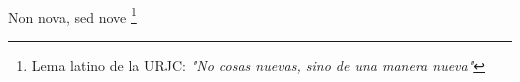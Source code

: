 \ \vspace{3cm}
\begin{flushright}
Non nova, sed nove \footnote[1]{Lema latino de la URJC: \textit{"No cosas nuevas, sino de una manera nueva"}}\\
\end{flushright}

